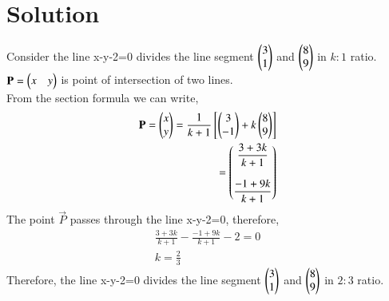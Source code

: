 \documentclass[journal,12pt,twocolumn]{IEEEtran}
\begin{document}
\section{Solution}
Consider the line x-y-2=0 divides the line segment $\begin{pmatrix}3 \\1\end{pmatrix}$ and $\begin{pmatrix}8\\9\end{pmatrix} $ in $k:1$ ratio.\\
$\mathbf{P}=\begin{pmatrix}x& y\end{pmatrix} $ is point of intersection of two lines.\\ 
From the section formula we can write,
\begin{align}
\mathbf{P} = \begin{pmatrix}x\\ y\end{pmatrix} = \displaystyle\frac{1}{k+1}\left[\begin{pmatrix}3\\-1\end{pmatrix}+ k\begin{pmatrix}8\\9\end{pmatrix}\right]\\
 = \begin{pmatrix}\displaystyle\frac{3+3k}{k+1} \\\\ \displaystyle\frac{-1+9k}{k+1}\end{pmatrix}
\end{align}
The point $\vec{P}$ passes through the line x-y-2=0, therefore,
\begin{align}
\displaystyle\frac{3+3k}{k+1} - \displaystyle\frac{-1+9k}{k+1} -2 = 0\\
k=\displaystyle\frac{2}{3}
\end{align}
Therefore, the line x-y-2=0 divides the line segment $\begin{pmatrix}3 \\1\end{pmatrix}$ and $\begin{pmatrix}8\\9\end{pmatrix} $ in $2:3$ ratio.
\end{document}
